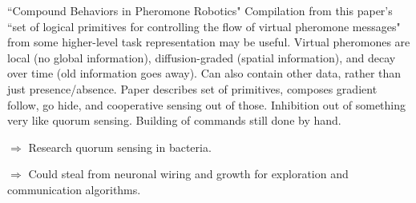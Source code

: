 \documentclass[]{article}
\begin{document}
``Compound Behaviors in Pheromone Robotics" \cite{payton2003compound} Compilation from this paper's ``set of logical primitives for controlling the flow of virtual pheromone messages" from some higher-level task representation may be useful. Virtual pheromones are local (no global information), diffusion-graded (spatial information), and decay over time (old information goes away). Can also contain other data, rather than just presence/absence. Paper describes set of primitives, composes gradient follow, go hide, and cooperative sensing out of those. Inhibition out of something very like quorum sensing. Building of commands still done by hand. 

$\Rightarrow$ Research quorum sensing in bacteria.

$\Rightarrow$ Could steal from neuronal wiring and growth for exploration and communication algorithms. 





\end{document}
